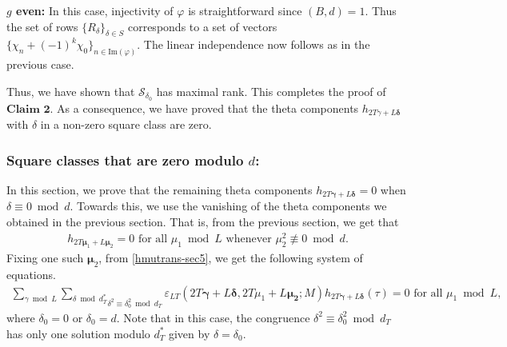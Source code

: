 \documentclass[11pt]{amsart}
\numberwithin{equation}{section}
\newcommand{\mc}{\mathcal}
\begin{document}
\textbf{$g$ even:} In this case, injectivity of $\varphi$ is straightforward since $(B,d)=1$. Thus the set of rows $\{R_\delta\}_{\delta \in S}$ corresponds to a set of vectors $\{ \chi_{n} +(-1)^k \chi_0 \}_{n \in \text{Im}(\varphi)}$. The linear independence now follows as in the previous case. 

Thus, we have shown that $\mc S_{\delta_0}$ has maximal rank. This completes the proof of $\textbf{Claim 2}$. As a consequence, we have proved that the theta components $h_{2T\gamma+L\bm\delta}$ with $\delta$ in a non-zero square class are zero.

\subsubsection{Square classes that are zero modulo $d$:}\label{sec:zerosqrcls} In this section, we prove that the remaining theta components $h_{2T\bm\gamma+L\bm\delta}=0$ when $\delta\equiv 0\bmod d$. Towards this, we use the vanishing of the theta components we obtained in the previous section. That is, from the previous section, we get that 
\begin{align}
    h_{2T\bm\mu_1+L\bm\mu_2}=0 \text{ for all } \mu_1\bmod L \text{ whenever } \mu_2^2\not\equiv 0\bmod d.
\end{align}
Fixing one such $\bm \mu_2$, from \eqref{hmutrans-sec5}, we get the following system of equations.
\begin{align}
    \sum_{\gamma\bmod L} \underset{{\delta}^2\equiv {\delta}_{0}^2 \bmod d_T}{\sum_{\delta\bmod d_T^*}}\varepsilon_{LT}(2T{\bm{ \gamma}}+L\bm\delta, 2T\mu_1+L\bm{\mu_2};  M)h_{2T{\bm{ \gamma}}+L\bm{\delta}}(\tau)=0 \text{ for all } \mu_1\bmod L,
\end{align}
where $\delta_0= 0$ or $\delta_0=d$. Note that in this case, the congruence $\delta^2\equiv {\delta}_{0}^2 \bmod d_T$ has only one solution modulo $d_T^*$ given by $\delta=\delta_0$.
\end{document}
